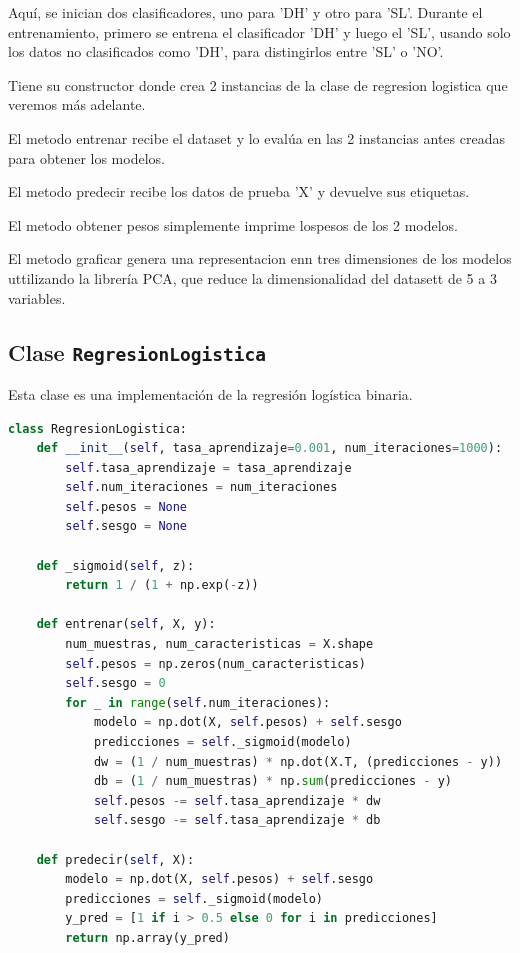 \documentclass[12pt]{article}
\begin{document}
Aquí, se inician dos clasificadores, uno para 'DH' y otro para 'SL'. Durante el entrenamiento, primero se entrena el clasificador 'DH' y luego el 'SL', usando solo los datos no clasificados como 'DH', para distingirlos entre 'SL' o 'NO'.

Tiene su constructor donde crea 2 instancias de la clase de regresion logistica que veremos más adelante.

El metodo entrenar recibe el dataset y lo evalúa en las 2 instancias antes creadas para obtener los modelos.

El metodo predecir recibe los datos de prueba 'X' y devuelve sus etiquetas.

El metodo obtener pesos simplemente imprime lospesos de los 2 modelos.

El metodo graficar genera una representacion enn tres dimensiones de los modelos uttilizando la librería PCA, que reduce la dimensionalidad del datasett de 5 a 3 variables. 

\vspace{1cm}

\subsection*{Clase \texttt{RegresionLogistica}}
Esta clase es una implementación de la regresión logística binaria.
\vspace{1cm}

\begin{lstlisting}[language=Python]
class RegresionLogistica:
    def __init__(self, tasa_aprendizaje=0.001, num_iteraciones=1000):
        self.tasa_aprendizaje = tasa_aprendizaje
        self.num_iteraciones = num_iteraciones
        self.pesos = None
        self.sesgo = None

    def _sigmoid(self, z):
        return 1 / (1 + np.exp(-z))

    def entrenar(self, X, y):
        num_muestras, num_caracteristicas = X.shape
        self.pesos = np.zeros(num_caracteristicas)
        self.sesgo = 0
        for _ in range(self.num_iteraciones):
            modelo = np.dot(X, self.pesos) + self.sesgo
            predicciones = self._sigmoid(modelo)
            dw = (1 / num_muestras) * np.dot(X.T, (predicciones - y))
            db = (1 / num_muestras) * np.sum(predicciones - y)
            self.pesos -= self.tasa_aprendizaje * dw
            self.sesgo -= self.tasa_aprendizaje * db

    def predecir(self, X):
        modelo = np.dot(X, self.pesos) + self.sesgo
        predicciones = self._sigmoid(modelo)
        y_pred = [1 if i > 0.5 else 0 for i in predicciones]
        return np.array(y_pred)
\end{lstlisting}
\vspace{1cm}
\end{document}
